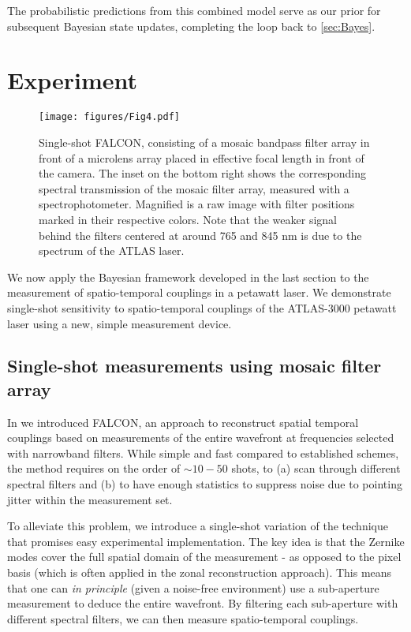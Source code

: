 \documentclass[9pt, twocolumn,superscriptaddress]{revtex4}
\begin{document}
The probabilistic predictions from this combined model serve as our prior for subsequent Bayesian state updates, completing the loop back to \cref{sec:Bayes}.

\section{Experiment}\label{sec:experiment}

\begin{figure}[t]
    \centering
    \texttt{[image: figures/Fig4.pdf]}
    \caption{Single-shot FALCON, consisting of a mosaic bandpass filter array in front of a microlens array placed in effective focal length in front of the camera. The inset on the bottom right shows the corresponding spectral transmission of the mosaic filter array, measured with a spectrophotometer. Magnified is a raw image with filter positions marked in their respective colors. Note that the weaker signal behind the filters centered at around 765 and 845 nm is due to the spectrum of the ATLAS laser.}
    \label{fig:All_in_one}
\end{figure}

We now apply the Bayesian framework developed in the last section to the measurement of spatio-temporal couplings in a petawatt laser. We demonstrate single-shot sensitivity to spatio-temporal couplings of the ATLAS-3000 petawatt laser using a new, simple measurement device. 

\subsection{Single-shot measurements using mosaic filter array}

In \cite{weisse2023b} we introduced FALCON, an approach to reconstruct spatial temporal couplings based on measurements of the entire wavefront at frequencies selected with narrowband filters. While simple and fast compared to established schemes, the method requires on the order of $\sim 10-50$ shots, to (a) scan through different spectral filters and (b) to have enough statistics to suppress noise due to pointing jitter within the measurement set. 

To alleviate this problem, we introduce a single-shot variation of the technique that promises easy experimental implementation. The key idea is that the Zernike modes cover the full spatial domain of the measurement - as opposed to the pixel basis (which is often applied in the zonal reconstruction approach). This means that one can \textit{in principle} (given a noise-free environment) use a sub-aperture measurement to deduce the entire wavefront. By filtering each sub-aperture with different spectral filters, we can then measure spatio-temporal couplings. 
\end{document}
